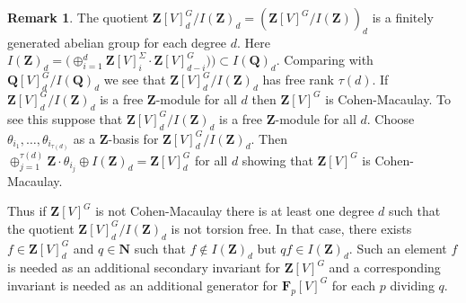 \documentclass[12pt]{amsart}
\newcommand{\NN}{\mathbf{N}} %
\newcommand{\QQ}{\mathbf{Q}} %
\newcommand{\ZZ}{\mathbf{Z}} %
\newcommand{\FF}{\mathbf{F}} %
\newcommand{\NN}{\mathbb{N}} %
\newcommand{\QQ}{\mathbb{Q}} %
\newcommand{\ZZ}{\mathbb{Z}} %
\newcommand{\FF}{\mathbb{F}} %
\theoremstyle{definition}
\newtheorem{remark}[thm]{Remark}
\begin{document}
\begin{remark}
The quotient $\ZZ[V]_d^G / I(\ZZ)_d = (\ZZ[V]^G / I(\ZZ))_d$ is a finitely 
generated abelian group for each degree $d$.  
Here $I(\ZZ)_d = \big(\oplus_{i=1}^d\ZZ[V]^\Sigma_i\cdot\ZZ[V]^G_{d-i})\big) \subset I(\QQ)_d$.
Comparing with $\QQ[V]^G_d/I(\QQ)_d$ we see that
$\ZZ[V]_d^G / I(\ZZ)_d$ has free rank $\tau(d)$.
If $\ZZ[V]_d^G / I(\ZZ)_d$ is a free $\ZZ$-module
for all $d$ then $\ZZ[V]^G$ is Cohen-Macaulay. To see this 
suppose that $\ZZ[V]_d^G / I(\ZZ)_d$ is a free $\ZZ$-module for all $d$.
Choose $\theta_{i_1},\dots,\theta_{i_{\tau(d)}}$ as a $\ZZ$-basis for $\ZZ[V]_d^G / I(\ZZ)_d$.
Then $\oplus_{j=1}^{\tau(d)} \ZZ\cdot \theta_{i_j} \oplus I(\ZZ)_d = \ZZ[V]_d^G$ for all $d$
showing that $\ZZ[V]^G$ is Cohen-Macaulay.

Thus
if $\ZZ[V]^G$ is not Cohen-Macaulay there is at least one degree $d$  such that the quotient 
$\ZZ[V]_d^G / I(\ZZ)_d$ is not 
torsion free.  In that case, there exists $f \in \ZZ[V]_d^G$ and $q \in \NN$ such that
$f \notin I(\ZZ)_d$ but $q f \in I(\ZZ)_d$.
 Such an element $f$ is needed as an additional secondary invariant for
$\ZZ[V]^G$ and a corresponding invariant is needed as an additional generator
for $\FF_p[V]^G$ for each $p$ dividing $q$.
\end{remark}
\end{document}
